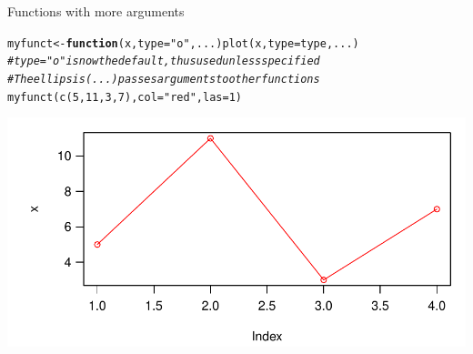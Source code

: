 \documentclass[xcolor=table,      handout ,    xcolor=dvipsnames]{beamer}\usepackage[]{graphicx}\usepackage[]{color}
\makeatletter
\newcommand{\hlnum}[1]{\textcolor[rgb]{0,0,0}{#1}}
\newcommand{\hlstr}[1]{\textcolor[rgb]{0.545,0.137,0.137}{#1}}
\newcommand{\hlcom}[1]{\textcolor[rgb]{0,0.392,0}{\textit{#1}}}
\newcommand{\hlstd}[1]{\textcolor[rgb]{0,0,0}{#1}}
\newcommand{\hlkwa}[1]{\textcolor[rgb]{1,0,0}{\textbf{#1}}}
\newcommand{\hlkwb}[1]{\textcolor[rgb]{0,0,0}{#1}}
\newcommand{\hlkwc}[1]{\textcolor[rgb]{1,0,1}{#1}}
\newcommand{\hlkwd}[1]{\textcolor[rgb]{0,0,1}{#1}}
\newenvironment{kframe}{%
 \def\at@end@of@kframe{}%
 \ifinner\ifhmode%
  \def\at@end@of@kframe{\end{minipage}}%
  \begin{minipage}{\columnwidth}%
 \fi\fi%
 \def\FrameCommand##1{\hskip\@totalleftmargin \hskip-\fboxsep
 \colorbox{shadecolor}{##1}\hskip-\fboxsep
     \hskip-\linewidth \hskip-\@totalleftmargin \hskip\columnwidth}%
 \MakeFramed {\advance\hsize-\width
   \@totalleftmargin\z@ \linewidth\hsize
   \@setminipage}}%
 {\par\unskip\endMakeFramed%
 \at@end@of@kframe}
\newenvironment{knitrout}{}{} %
\makeatother
\begin{document}
\begin{frame}[fragile]{Functions with more arguments}
\begin{knitrout}\small
{}\color{fgcolor}\begin{kframe}
\begin{alltt}
\hlstd{myfunct} \hlkwb{<-} \hlkwa{function}\hlstd{(}\hlkwc{x}\hlstd{,} \hlkwc{type}\hlstd{=}\hlstr{"o"}\hlstd{,} \hlkwc{...}\hlstd{)} \hlkwd{plot}\hlstd{(x,} \hlkwc{type}\hlstd{=type, ...)}
\hlcom{# type="o" is now the default, thus used unless specified}
\hlcom{# The ellipsis (...) passes arguments to other functions}
\hlkwd{myfunct}\hlstd{(}  \hlkwd{c}\hlstd{(}\hlnum{5}\hlstd{,}\hlnum{11}\hlstd{,}\hlnum{3}\hlstd{,}\hlnum{7}\hlstd{) ,} \hlkwc{col}\hlstd{=}\hlstr{"red"}\hlstd{,} \hlkwc{las}\hlstd{=}\hlnum{1}\hlstd{)}
\end{alltt}
\end{kframe}

{\centering \includegraphics[width=\textwidth]{./fig/funct4-1} 

}



\end{knitrout}
\vspace{-2em}
\end{frame}

\end{document}
